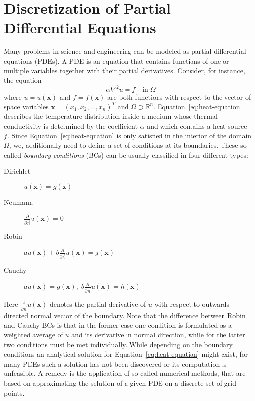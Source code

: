 \section{Discretization of Partial Differential Equations}
Many problems in science and engineering can be modeled as partial differential equations (PDEs). %
A PDE is an equation that contains functions of one or multiple variables together with their partial derivatives.
Consider, for instance, the equation
\begin{equation}
	-\alpha \nabla^2 u = f \quad \text{in} \; \Omega 
	\label{eq:heat-equation}
\end{equation}
where $u = u(\bm{x})$ and $f = f(\bm{x})$ are both functions with respect to the vector of space variables $\bm{x} = (x_1, x_2, \dots, x_n)^T$ and $\Omega \supset \mathbb{R}^n$.
Equation~\eqref{eq:heat-equation} describes the temperature distribution inside a medium whose thermal conductivity is determined by the coefficient $\alpha$ and which contains a heat source $f$.
Since Equation~\eqref{eq:heat-equation} is only satisfied in the interior of the domain $\Omega$, we, additionally need to define a set of conditions at its boundaries.
These so-called \emph{boundary conditions} (BCs) can be usually classified in four different types:
\begin{description}
	\item[Dirichlet] $u(\bm{x}) = g(\bm{x})$
	\item[Neumann] $\frac{\partial}{\partial \vec{n}} u(\bm{x}) = 0$
	\item[Robin] $a u(\bm{x}) + b \frac{\partial}{\partial \vec{n}} u(\bm{x}) = g(\bm{x})$
	\item[Cauchy] $a u(\bm{x}) = g(\bm{x}), \; b \frac{\partial}{\partial \vec{n}} u(\bm{x}) = h(\bm{x})$
\end{description}
Here $\frac{\partial}{\partial \vec{n}} u(\bm{x})$ denotes the partial derivative of $u$ with respect to outwards-directed normal vector of the boundary.
Note that the difference between Robin and Cauchy BCs is that in the former case one condition is formulated as a weighted average of $u$ and its derivative in normal direction, while for the latter two conditions must be met individually.
While depending on the boundary conditions an analytical solution for Equation~\eqref{eq:heat-equation} might exist, for many PDEs such a solution has not been discovered or its computation is unfeasible.
A remedy is the application of so-called numerical methods, that are based on approximating the solution of a given PDE on a discrete set of grid points. 
